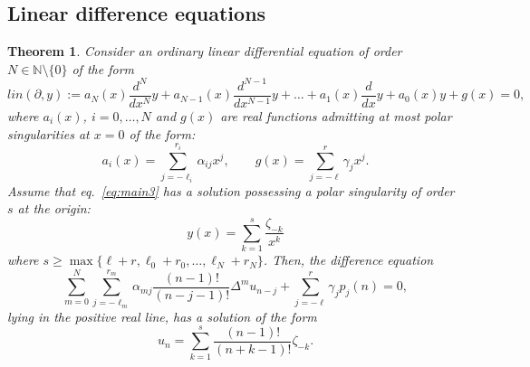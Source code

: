 \documentclass[10pt]{amsart}
\numberwithin{equation}{section}
\newtheorem{theorem}{Theorem}
\theoremstyle{definition}
\begin{document}
\subsection{Linear difference equations}
\label{sec8.1}

\begin{theorem}
\label{main3}
Consider an ordinary linear differential equation of order
$N\in \mathbb{N}\setminus \{0\}$ of the form
\begin{equation}
\label{eq:main3}
lin(\partial , y):=a_{N}(x) \frac{d^{N}}{dx^{N}}y + a_{N-1}(x)
\frac{d^{N-1}}{dx^{N-1}}y +\ldots +a_{1}(x) \frac{d}{dx} y+a_{0}(x) y +g(x)=0,
\end{equation}
where $a_{i}(x)$, $i=0,\ldots ,N$ and $g(x)$ are real functions admitting at
most polar singularities at $x=0$ of the form:
\begin{equation}
\label{eq:8.2}
a_{i}(x)=\sum _{j=-\ell _{i}}^{r_{i}}\alpha _{ij} x^{j}, \qquad g(x)=
\sum _{j=-\ell}^{r}\gamma _{j} x^{j} .
\end{equation}
Assume that eq.~\eqref{eq:main3} has a solution possessing a polar singularity
of order $s$ at the origin:
\begin{equation}
\label{eq:lpolsol}
y(x)=\sum _{k=1}^{s}\frac{\zeta _{-k}}{x^{k}}
\end{equation}
where
$s\geq \max \{\ell +r,\ell _{0}+r_{0},\ldots ,\ell _{N}+r_{N} \}$. Then,
the difference equation
\begin{equation}
\label{eq:8.4}
\sum _{m=0}^{N} \sum _{j=-\ell _{m}}^{r_{m}} \alpha _{mj}
\frac{(n-1)!}{(n-j-1)!}\Delta ^{m}u_{n-j}+\sum _{j=-\ell}^{r}\gamma _{j}
p_{j}(n)=0,
\end{equation}
lying in the positive real line, has a solution of the form
\begin{equation}
\label{eq:8.5}
u_{n}=\sum _{k=1}^{s}\frac{(n-1)!}{(n+k-1)!}\zeta _{-k}.
\end{equation}
\end{theorem}
\end{document}
